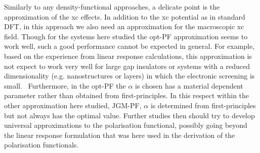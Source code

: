 Similarly to any density-functional approaches, a delicate point is the approximation of the xc effects. In addition to the xc potential as in standard DFT, in this approach we also need an approximation for the macroscopic xc field. Though for the systems here studied the opt-PF approximation seems to work well, such a good performance cannot be expected in general. For example, based on the experience from linear response calculations, this approximation is not expect to work very well for large gap insulators or systems with a reduced dimensionality (e.g. nanostructures or layers) in which the electronic screening is small.~\cite{PhysRevB.68.205112} Furthermore, in the opt-PF the $\alpha$ is chosen has a material dependent parameter rather than obtained from first-principles. In this respect within the other approximation here studied, JGM-PF, $\alpha$ is determined from first-principles but not always has the optimal value. Further studies then should try to develop universal approximations to the polarisation functional, possibly going beyond the linear response formulation that was here used in the derivation of the polarisation functionals.  
